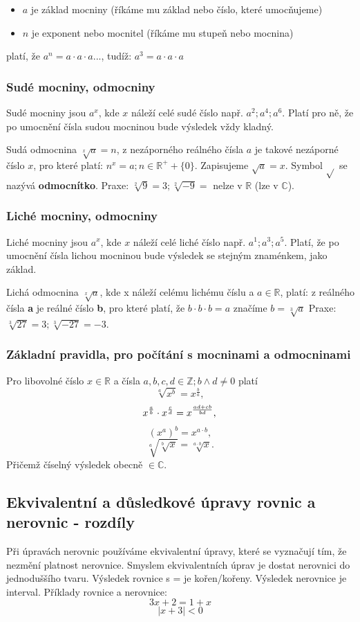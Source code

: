 \begin{itemize}
    \item $a$ je základ mocniny (říkáme mu základ nebo číslo, které umocňujeme)
    \item $n$ je exponent nebo mocnitel (říkáme mu stupeň nebo mocnina)
\end{itemize}
platí, že $a^n = a \cdot a \cdot a...$, tudíž: $a^3=a \cdot a \cdot a$
\subsubsection{Sudé mocniny, odmocniny}
Sudé mocniny jsou $a^x$, kde $x$ náleží celé sudé číslo např. $a^2; a^4; a^6$. Platí pro ně, že po umocnění čísla sudou mocninou bude výsledek vždy kladný.

Sudá odmocnina $\sqrt[x]{a}=n$, z nezáporného reálného čísla $a$ je takové nezáporné číslo $x$, pro které platí: $n^x = a; n\in\mathbb{R}^++\{0\}$.  Zapisujeme $\sqrt{a} = x$. Symbol $\sqrt{}$ se nazývá \textbf{odmocnítko}. Praxe: $\sqrt[2]{9}=3; \sqrt[2]{-9}=$ nelze v $\mathbb{R}$ (lze v $\mathbb{C}$).
\subsubsection{Liché mocniny, odmocniny}
Liché mocniny jsou $a^x$, kde $x$ náleží celé liché číslo např. $a^1; a^3; a^5$. Platí, že po umocnění čísla lichou mocninou bude výsledek se stejným znaménkem, jako základ.

Lichá odmocnina $\sqrt[x]{a}$, kde x náleží celému lichému číslu a $a \in\mathbb{R}$, platí: z reálného čísla \textbf{a} je reálné číslo \textbf{b}, pro které platí, že $b\cdot b \cdot b=a$ značíme $b=\sqrt[3]{a}$ Praxe: $\sqrt[3]{27}=3; \sqrt[3]{-27}=-3$. 


\subsubsection{Základní pravidla, pro počítání s mocninami a odmocninami}
Pro libovolné číslo $x \in \mathbb{R}$ a čísla $a,b,c,d \in \mathbb{Z}; b \land d\neq 0$ platí 
$$
    \sqrt[a]{x^b}=x^{\frac{b}{a}}, 
$$
$$
    x^\frac{a}{b} \cdot x^\frac{c}{d}=x^\frac{ad+cb}{bd}, \\
$$
$$
    (x^a)^b=x^{a \cdot b},
$$
$$
    \sqrt[a]{\sqrt[b]{x}} = \sqrt[a\cdot b]{x}.
$$
Přičemž číselný výsledek obecně $\in \mathbb{C}.$
\subsection{Ekvivalentní a důsledkové úpravy rovnic a nerovnic - rozdíly}
Při úpravách nerovnic používáme ekvivalentní úpravy, které se vyznačují tím, že nezmění platnost nerovnice. Smyslem ekvivalentních úprav je dostat nerovnici do jednoduššího tvaru. Výsledek rovnice s = je kořen/kořeny. Výsledek nerovnice je interval. Příklady rovnice a nerovnice:
$$
    3x+2=1+x
$$
$$
    |x+3| < 0
$$
